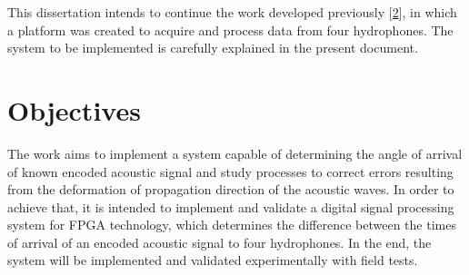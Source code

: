 
This dissertation intends to continue the work developed previously [\hyperref[eq:spd-sound]{2}], in which a platform was created to acquire and process data from four hydrophones. The system to be implemented is carefully explained in the present document.
 


\section{Objectives} \label{sec:objective}

The work aims to implement a system capable of determining the angle of arrival of known encoded acoustic signal and study processes to correct errors resulting from the deformation of propagation direction of the acoustic waves. In order to achieve that, it is intended to implement and validate a digital signal processing system for FPGA technology, which determines the difference between the times of arrival of an encoded acoustic signal to four hydrophones. In the end, the system will be implemented and validated experimentally with field tests.
